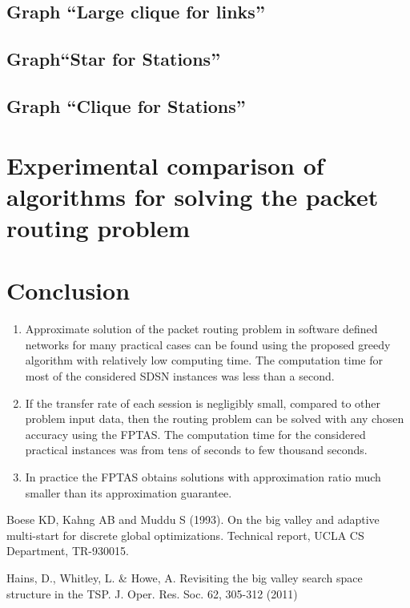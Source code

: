 \documentclass{ifacconf}
\begin{document}
\subsection{Graph ``Large clique for links''} \label{subsec:clique}


\subsection{Graph``Star  for Stations''}\label{subsec:basestar}


\subsection{ Graph ``Clique  for Stations''}\label{subsec:baseclique}


\section{Experimental comparison of algorithms for solving the packet routing problem}
\label{subsec:exp}

\section{Conclusion}

\begin{enumerate}

\item Approximate solution of the packet routing problem in software defined networks for many practical cases can be
found using the proposed greedy algorithm with relatively low computing time.
The computation time for most of the considered SDSN instances was less than a second.

\item If the transfer rate of each session is negligibly small, compared to other problem input data, then the routing problem 
can be solved with any chosen accuracy using the FPTAS. The computation time for the considered practical instances 
was from tens of seconds to few thousand seconds.

\item In practice the FPTAS obtains solutions with approximation ratio much smaller than its approximation guarantee.

\end{enumerate}

   
                                                  
\begin{thebibliography}{xx}  %

Boese KD, Kahng AB and Muddu S (1993). On the big valley and adaptive multi-start for discrete global optimizations. Technical report, 
UCLA CS Department, TR-930015.

 Hains, D., Whitley, L. \& Howe, A. Revisiting the big valley search space structure in the TSP. 
J. Oper. Res. Soc. 62, 305-312 (2011) 


\end{thebibliography}
\end{document}
